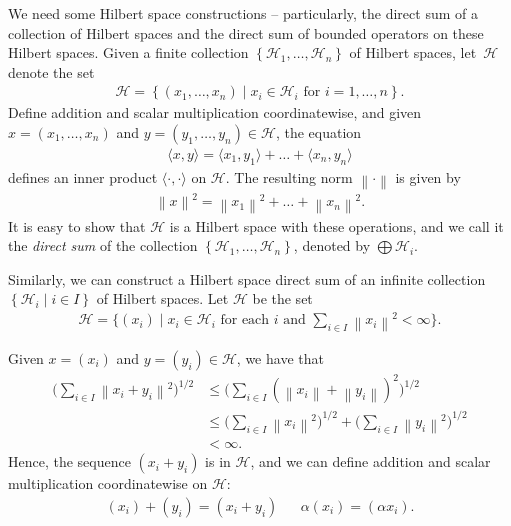 \documentclass[11pt,a4paper]{report}
\theoremstyle{plain}
\theoremstyle{definition}
\newcommand{\1}{\mathbbm{1}}
\renewcommand{\H}{\mathcal{H}}
\renewcommand{\oplus}{\textstyle\bigoplus}
\begin{document}
We need some Hilbert space constructions -- particularly, the direct sum of a 
collection of Hilbert spaces and the direct sum of bounded operators on these 
Hilbert spaces. Given a finite collection $\left\{\H_1,\dots,\H_n\right\}$ of Hilbert 
spaces, let~$\H$ denote the set
\begin{align*}
	\H  = \left\{(x_1,\dots,x_n) \mid x_i \in \H_i \mbox { for } i=1,\dots,n \right\}.
\end{align*}
Define addition and scalar multiplication coordinatewise, and given 
$x=(x_1,\dots,x_n)$ and $y=(y_1,\dots,y_n) \in \H$, the equation
\begin{align*}
	\langle x,y\rangle = \langle x_1,y_1\rangle + \dots + \langle x_n,y_n \rangle
\end{align*}
defines an inner product $\langle\cdot,\cdot\rangle$ on $\H$. The resulting norm 
$\left\|\cdot\right\|$ is given by
\begin{align*}
	\left\|x\right\|^2 = \left\|x_1\right\|^2 + \dots + \left\|x_n\right\|^2.
\end{align*}
It is easy to show that $\H$ is a Hilbert space with these operations, and we 
call it the \emph{direct sum} of the collection 
$\left\{\H_1,\dots,\H_n\right\}$, denoted by $\oplus\H_i$.

Similarly, we can construct a Hilbert space direct sum of an infinite collection 
$\left\{\H_i \mid i\in I\right\}$ of Hilbert spaces. Let $\H$ be the set
\begin{align*}
	\H= \Big\{(x_i) \mid x_i \in \H_i \mbox{ for each }i 
					\mbox{ and } \sum_{i\in I}{\left\|x_i\right\|^2} < \infty \Big\}.
\end{align*}

Given $x=(x_i)$ and $y=(y_i)\in\H$, we have that
\begin{align*}
			\Big(\sum_{i\in I}{\left\|x_i+y_i\right\|^2}\Big)^{1/2}
	&\leq	\Big(\sum_{i\in I}{(\left\|x_i\right\|+\left\|y_i\right\|)^2}\Big)^{1/2}		\\
	&\leq	\Big(\sum_{i\in I}{\left\|x_i\right\|^2}\Big)^{1/2}		+
						\Big(\sum_{i\in I}{\left\|y_i\right\|^2}\Big)^{1/2}					\\
	&< 		\infty.
\end{align*}
Hence, the sequence $(x_i+y_i)$ is in $\H$, and we can define addition and 
scalar multiplication coordinatewise on $\H$:
\begin{align*}
	(x_i)+(y_i)=(x_i+y_i) && \alpha(x_i) = (\alpha x_i).
\end{align*}
\end{document}
